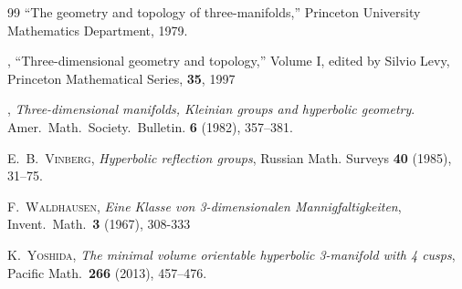 \begin{thebibliography}{99}
 \bysame ``The geometry and topology of three-manifolds,'' Princeton University Mathematics Department, 1979.

 \bysame, ``Three-dimensional geometry and topology,'' Volume I, edited by Silvio Levy, Princeton Mathematical Series, \textbf{35}, 1997

 \bysame, \emph{Three-dimensional manifolds, Kleinian groups and hyperbolic geometry}. Amer.~Math.~Society.~Bulletin. \textbf{6} (1982), 357--381.

 \textsc{E.~B.~Vinberg}, \emph{Hyperbolic reflection groups}, Russian Math. Surveys \textbf{40} (1985), 31--75.

 \textsc{F.~Waldhausen}, \emph{Eine Klasse von 3-dimensionalen Mannigfaltigkeiten}, Invent.~Math.~\textbf{3} (1967), 308-333

 \textsc{K.~Yoshida}, \emph{The minimal volume orientable hyperbolic 3-manifold with 4 cusps}, Pacific Math.~\textbf{266} (2013), 457--476.

\end{thebibliography}